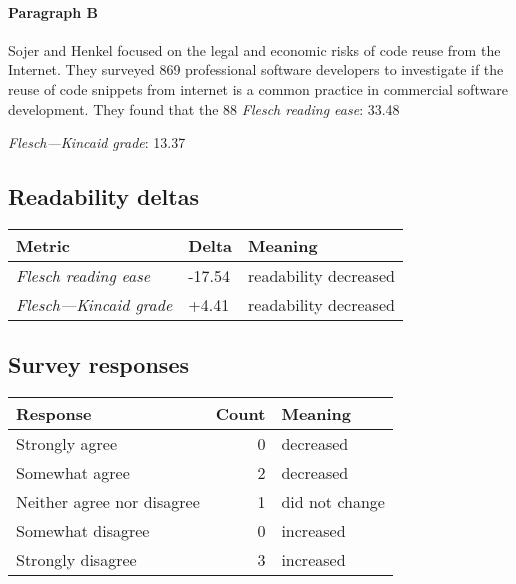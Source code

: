 \paragraph{Paragraph B}
Sojer and Henkel focused on the legal and economic risks of code reuse from the Internet. They surveyed 869 professional software developers to investigate if the reuse of code snippets from internet is a common practice in commercial software development. They found that the 88%
\emph{Flesch reading ease}: 33.48\par
\emph{Flesch---Kincaid grade}: 13.37

\subsection{Readability deltas}

\begin{tabular}{lll}
\toprule
               \textbf{Metric} & \textbf{Delta} &       \textbf{Meaning} \\
\midrule
    \emph{Flesch reading ease} &         -17.54 &  readability decreased \\
 \emph{Flesch---Kincaid grade} &          +4.41 &  readability decreased \\
\bottomrule
\end{tabular}

\subsection{Survey responses}
\begin{tabular}{lrl}
\toprule
          \textbf{Response} &  \textbf{Count} & \textbf{Meaning} \\
\midrule
             Strongly agree &               0 &        decreased \\
             Somewhat agree &               2 &        decreased \\
 Neither agree nor disagree &               1 &   did not change \\
          Somewhat disagree &               0 &        increased \\
          Strongly disagree &               3 &        increased \\
\bottomrule
\end{tabular}

